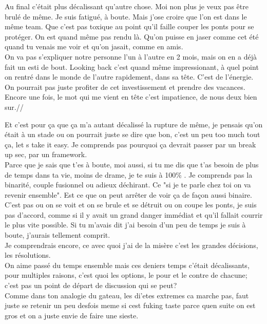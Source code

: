 Au final c'était plus décalissant qu'autre chose. Moi non plus je veux
pas être brulé de même. Je suis fatigué, à boute. Mais j'ose croire que
l'on est dans le même team. Que c'est pas toxique au point qu'il faille
couper les ponts pour se protéger. On est quand même pas rendu là.
Qu'on puisse en jaser comme cet été quand tu venais me voir et qu'on
jasait, comme en amis. \\

On va pas s'expliquer notre personne l'un à l'autre en 2 mois,
mais on en a déjà fait un esti de bout. Looking back c'est quand même
impressionant, à quel point on rentré dans le monde de l'autre rapidement,
dans sa tête. C'est de l'énergie. On pourrait pas juste  profiter de
cet investissement et prendre des vacances. Encore une fois, le mot
qui me vient en tête c'est impatience, de nous deux bien sur.//

Et c'est pour ça que ça m'a autant décalissé la rupture de même,
je pensais qu'on était à un stade ou on pourrait juste se dire 
que bon, c'est un peu too much tout ça, let s take it easy.
Je comprends pas pourquoi ça devrait passer par un break  up sec,
par un framework. \\

Parce que je sais que t'es à boute, moi aussi, si tu me dis
que t'as besoin de plus de temps dans ta vie, moins de drame,
je te suis à 100\% . Je comprends pas la binarité, couple fusionnel
ou adieux déchirant. Ce "si je te parle chez toi on va revenir ensemble".
Est ce que on peut arrêter de voir ça de façon aussi binaire.\\

C'est pas ou on se voit et on se brule et se détruit ou on coupe les
ponts, je suis pas d'accord, comme si il y avait un grand danger immédiat
et qu'il fallait courrir le plus vite possible. Si tu m'avais dit j'ai besoin
d'un peu de temps je suis à boute, j'aurais tellement comprit.\\

Je comprendrais encore, ce avec quoi j'ai de la misère c'est les grandes
décisions, les résolutions. \\

On aime passé du temps ensemble mais ces deniers temps c'était décalissants,
pour multiples raisons, c'est quoi les options, le pour et le contre de chacune;
c'est pas un point de départ de discussion qui se peut?\\

Comme dans ton analogie du gateau, les di'etes extremes ca marche pas,
faut juste se retenir un peu desfois meme si cest fuking taste parce quen
suite on est gros et on a juste envie de faire une sieste.






